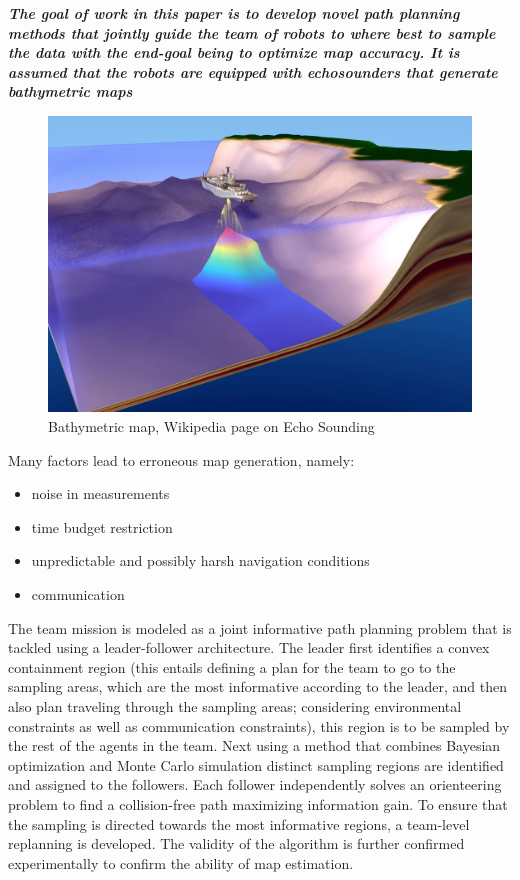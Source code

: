 \documentclass{article}
\begin{document}
\textbf{\textit{The goal of work in this paper is to develop novel path planning methods that jointly guide the team of robots to where best to sample the data with the end-goal being to optimize map accuracy. It is assumed that the robots are equipped with echosounders that generate bathymetric maps}} 
\begin{figure}[htbp]
	\centerline{\includegraphics[scale=0.4]{Echo_Sounding_USN.jpg}}
	\caption{Bathymetric map, Wikipedia page on Echo Sounding}
	\label{fig6}
\end{figure}




\vspace{5pt}

Many factors lead to erroneous map generation, namely:
 \begin{itemize}
 	\item noise in measurements 
 	\item time budget restriction
 	\item unpredictable and possibly harsh navigation conditions
 	\item communication 
 \end{itemize}

\vspace{5pt}

The team mission is modeled as a joint informative path planning problem that is tackled using a leader-follower architecture. The leader first identifies a convex containment region (this entails defining a plan for the team to go to the sampling areas, which are the most informative according to the leader, and then also plan traveling through the sampling areas; considering environmental constraints as well as communication constraints), this region is to be sampled by the rest of the agents in the team. Next using a method that combines Bayesian optimization and Monte Carlo simulation distinct sampling regions are identified and assigned to the followers. Each follower independently solves an orienteering problem to find a collision-free path maximizing information gain. To ensure that the sampling is directed towards the most informative regions, a team-level replanning is developed. 
The validity of the algorithm is further confirmed experimentally to confirm the ability of map estimation. 
\end{document}
